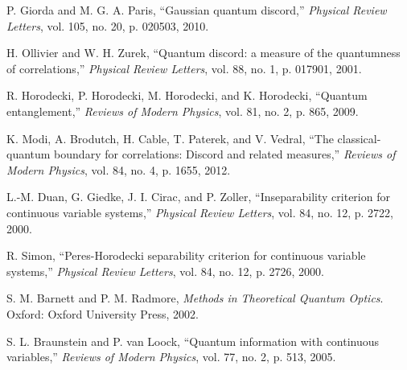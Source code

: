 \begin{thebibliography}{99}
P. Giorda and M. G. A. Paris, ``Gaussian quantum discord,'' \textit{Physical Review Letters}, vol. 105, no. 20, p. 020503, 2010.

H. Ollivier and W. H. Zurek, ``Quantum discord: a measure of the quantumness of correlations,'' \textit{Physical Review Letters}, vol. 88, no. 1, p. 017901, 2001.

R. Horodecki, P. Horodecki, M. Horodecki, and K. Horodecki, ``Quantum entanglement,'' \textit{Reviews of Modern Physics}, vol. 81, no. 2, p. 865, 2009.

K. Modi, A. Brodutch, H. Cable, T. Paterek, and V. Vedral, ``The classical-quantum boundary for correlations: Discord and related measures,'' \textit{Reviews of Modern Physics}, vol. 84, no. 4, p. 1655, 2012.

L.-M. Duan, G. Giedke, J. I. Cirac, and P. Zoller, ``Inseparability criterion for continuous variable systems,'' \textit{Physical Review Letters}, vol. 84, no. 12, p. 2722, 2000.

R. Simon, ``Peres-Horodecki separability criterion for continuous variable systems,'' \textit{Physical Review Letters}, vol. 84, no. 12, p. 2726, 2000.

S. M. Barnett and P. M. Radmore, \textit{Methods in Theoretical Quantum Optics}. Oxford: Oxford University Press, 2002.

S. L. Braunstein and P. van Loock, ``Quantum information with continuous variables,'' \textit{Reviews of Modern Physics}, vol. 77, no. 2, p. 513, 2005.

\end{thebibliography}

